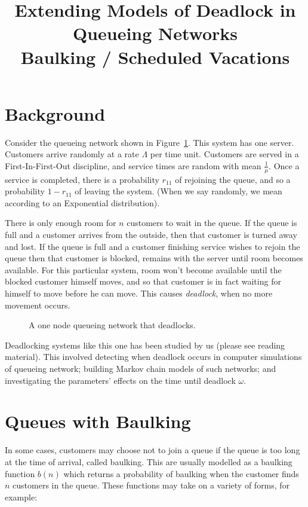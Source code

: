 \documentclass{article}
\title{Extending Models of Deadlock in Queueing Networks\\Baulking / Scheduled Vacations}
\author{}
\date{}
\begin{document}
\onehalfspacing

\maketitle

\section{Background}
Consider the queueing network shown in Figure~\ref{fig:1nodenetwork}. This system has one server. Customers arrive randomly at a rate $\Lambda$ per time unit. Customers are served in a First-In-First-Out discipline, and service times are random with mean $\frac{1}{\mu}$. Once a service is completed, there is a probability $r_{11}$ of rejoining the queue, and so a probability $1 - r_{11}$ of leaving the system. (When we say randomly, we mean according to an Exponential distribution).

There is only enough room for $n$ customers to wait in the queue. If the queue is full and a customer arrives from the outside, then that customer is turned away and lost. If the queue is full and a customer finishing service wishes to rejoin the queue then that customer is blocked, remains with the server until room becomes available. For this particular system, room won't become available until the blocked customer himself moves, and so that customer is in fact waiting for himself to move before he can move. This causes \textit{deadlock}, when no more movement occurs.

\begin{figure}[htbp!]
	\begin{center}
		
		\caption{A one node queueing network that deadlocks.}
		\label{fig:1nodenetwork}
	\end{center}
\end{figure}

Deadlocking systems like this one has been studied by us (please see reading material). This involved detecting when deadlock occurs in computer simulations of queueing network; building Markov chain models of such networks; and investigating the parameters' effects on the time until deadlock $\omega$.


\section{Queues with Baulking}

In some cases, customers may choose not to join a queue if the queue is too long at the time of arrival, called baulking. This are usually modelled as a baulking function $b(n)$ which returns a probability of baulking when the customer finds $n$ customers in the queue. These functions may take on a variety of forms, for example:
\end{document}
